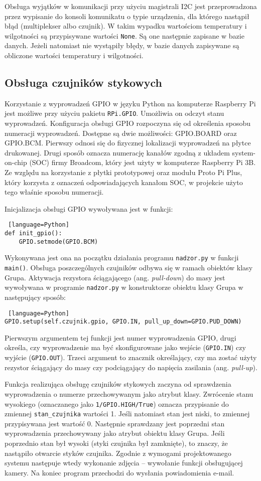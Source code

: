 \documentclass[a4paper,11pt,twoside]{article}
\begin{document}
Obsługa wyjątków w komunikacji przy użyciu magistrali I2C jest przeprowadzona przez wypisanie do konsoli komunikatu o typie urządzenia, dla którego nastąpił błąd (multiplekser albo czujnik). W takim wypadku wartościom temperatury i wilgotności są przypisywane wartości \texttt{None}. Są one następnie zapisane w bazie danych. Jeżeli natomiast nie wystąpiły błędy, w bazie danych zapisywane są obliczone wartości temperatury i wilgotności.

\subsection{Obsługa czujników stykowych}
Korzystanie z wyprowadzeń GPIO w języku Python na komputerze Raspberry Pi jest możliwe przy użyciu pakietu \texttt{RPi.GPIO}. Umożliwia on odczyt stanu wyprowadzeń. Konfiguracja obsługi GPIO rozpoczyna się od określenia sposobu numeracji wyprowadzeń. Dostępne są dwie możliwości: GPIO.BOARD oraz GPIO.BCM. Pierwszy odnosi się do fizycznej lokalizacji wyprowadzeń na płytce drukowanej. Drugi sposób oznacza numerację kanałów zgodną z układem system-on-chip (SOC) firmy Broadcom, który jest użyty w komputerze Raspberry Pi 3B. Ze względu na korzystanie z płytki prototypowej oraz modułu Proto Pi Plus, który korzysta z oznaczeń odpowiadających kanałom SOC, w projekcie użyto tego właśnie sposobu numeracji.

Inicjalizacja obsługi GPIO wywoływana jest w funkcji:  
\begin{lstlisting} [language=Python]
def init_gpio():
    GPIO.setmode(GPIO.BCM)
\end{lstlisting}
Wykonywana jest ona na początku działania programu \texttt{nadzor.py} w funkcji \texttt{main()}. Obsługa poszczególnych czujników odbywa się w ramach obiektów klasy Grupa. Aktywacja rezystora ściągającego (ang. \textit{pull-down}) do masy jest wywoływana w programie \texttt{nadzor.py} w konstruktorze obiektu klasy Grupa w następujący sposób:
\begin{lstlisting} [language=Python]
GPIO.setup(self.czujnik.gpio, GPIO.IN, pull_up_down=GPIO.PUD_DOWN)
\end{lstlisting}
Pierwszym argumentem tej funkcji jest numer wyprowadzenia GPIO, drugi określa, czy wyprowadzenie ma być skonfigurowane jako wejście (\texttt{GPIO.IN}) czy wyjście (\texttt{GPIO.OUT}). Trzeci argument to znacznik określający, czy ma zostać użyty rezystor ściągający do masy czy podciągający do napięcia zasilania (ang. \textit{pull-up}).

Funkcja realizująca obsługę czujników stykowych zaczyna od sprawdzenia wyprowadzenia o numerze przechowywanym jako atrybut klasy. Zwrócenie stanu wysokiego (oznaczanego jako \texttt{1/GPIO.HIGH/True}) oznacza przypisanie do zmiennej \texttt{stan{\_}czujnika} wartości 1. Jeśli natomiast stan jest niski, to zmiennej przypisywana jest wartość 0. Następnie sprawdzany jest poprzedni stan wyprowadzenia przechowywany jako atrybut obiektu klasy Grupa. Jeśli poprzednio stan był wysoki (styki czujnika był zamknięte), to znaczy, że nastąpiło otwarcie styków czujnika. Zgodnie z wymogami projektowanego systemu następuje wtedy wykonanie zdjęcia -- wywołanie funkcji obsługującej kamery. Na koniec program przechodzi do wysłania powiadomienia e-mail.
\end{document}
